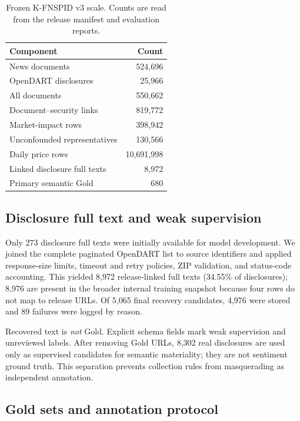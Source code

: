\documentclass[11pt]{article}
\newcommand{\dataset}{K-FNSPID v3}
\begin{document}
\begin{table}[t]
\centering
\small
\begin{tabular}{lr}
\toprule
Component & Count \\
\midrule
News documents & 524,696 \\
OpenDART disclosures & 25,966 \\
All documents & 550,662 \\
Document--security links & 819,772 \\
Market-impact rows & 398,942 \\
Unconfounded representatives & 130,566 \\
Daily price rows & 10,691,998 \\
Linked disclosure full texts & 8,972 \\
Primary semantic Gold & 680 \\
\bottomrule
\end{tabular}
\caption{Frozen \dataset{} scale. Counts are read from the release manifest and evaluation reports.}
\label{tab:scale}
\end{table}

\subsection{Disclosure full text and weak supervision}

Only 273 disclosure full texts were initially available for model development. We joined the complete paginated OpenDART list to source identifiers and applied response-size limits, timeout and retry policies, ZIP validation, and status-code accounting. This yielded 8,972 release-linked full texts (34.55\% of disclosures); 8,976 are present in the broader internal training snapshot because four rows do not map to release URLs. Of 5,065 final recovery candidates, 4,976 were stored and 89 failures were logged by reason.

Recovered text is \emph{not} Gold. Explicit schema fields mark weak supervision and unreviewed labels. After removing Gold URLs, 8,302 real disclosures are used only as supervised candidates for semantic materiality; they are not sentiment ground truth. This separation prevents collection rules from masquerading as independent annotation.

\subsection{Gold sets and annotation protocol}
\end{document}
